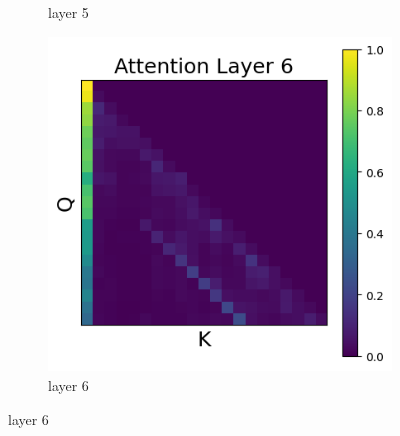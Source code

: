 \documentclass[11pt]{article}
\begin{document}
\begin{figure}[t]
\begin{subfigure}[t]{0.24\textwidth}
    \caption{layer 5}
  \end{subfigure}\hfill
  \begin{subfigure}[t]{0.24\textwidth}
    \centering
    \includegraphics[width=1.4\columnwidth]{figures/intervention4/layer_6.png}
    \caption{layer 6}
  \end{subfigure}\hfill


\end{figure}
\end{document}
